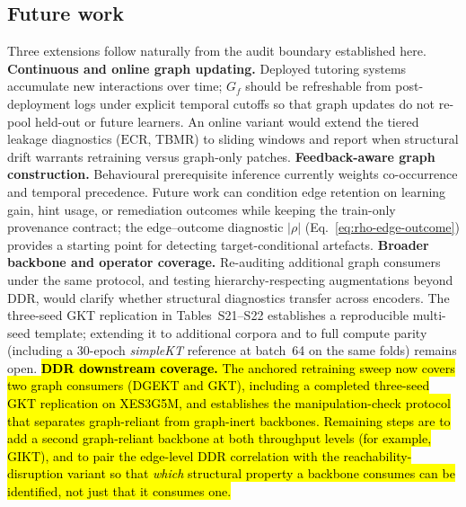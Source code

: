 \documentclass[pdflatex,sn-mathphys-num]{sn-jnl}
\newcommand{\DDR}{\textsc{DDR}}
\newcommand{\rev}[1]{\hl{#1}}
\newcommand{\rev}[1]{#1}
\begin{document}
\subsection{Future work}
\label{sec:future-work}
Three extensions follow naturally from the audit boundary established here.
\textbf{Continuous and online graph updating.} Deployed tutoring systems
accumulate new interactions over time; $G_f$ should be refreshable from
post-deployment logs under explicit temporal cutoffs so that graph updates
do not re-pool held-out or future learners. An online variant would extend
the tiered leakage diagnostics ($\mathrm{ECR}$, TBMR) to sliding windows
and report when structural drift warrants retraining versus graph-only
patches.
\textbf{Feedback-aware graph construction.} Behavioural prerequisite
inference currently weights co-occurrence and temporal precedence. Future
work can condition edge retention on learning gain, hint usage, or
remediation outcomes while keeping the train-only provenance contract;
the edge--outcome diagnostic $|\rho|$ (Eq.~\eqref{eq:rho-edge-outcome})
provides a starting point for detecting target-conditional artefacts.
\textbf{Broader backbone and operator coverage.} Re-auditing additional
graph consumers under the same protocol, and testing hierarchy-respecting
augmentations beyond \DDR{}, would clarify whether structural diagnostics
transfer across encoders. The three-seed GKT replication in Tables~S21--S22
establishes a reproducible multi-seed template; extending it to additional
corpora and to full compute parity (including a 30-epoch \textit{simpleKT}
reference at batch~64 on the same folds) remains open.
\rev{\textbf{\DDR{} downstream coverage.} The anchored retraining sweep now covers
two graph consumers (DGEKT and GKT), including a completed three-seed GKT
replication on XES3G5M, and establishes the manipulation-check protocol that
separates graph-reliant from graph-inert backbones. Remaining steps are to add a
second graph-reliant backbone at both throughput levels (for example, GIKT), and to pair the
edge-level \DDR{} correlation with the reachability-disruption variant so that
\emph{which} structural property a backbone consumes can be identified, not just
that it consumes one.}

\end{document}
